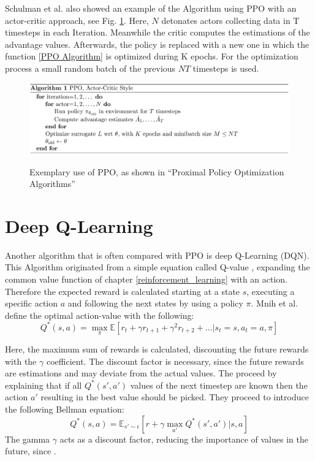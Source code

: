 Schulman et al. also showed an example of the Algorithm using PPO with an actor-critic approach, see Fig. \ref{fig:ppo_algo_code}. Here, $N$ detonates actors collecting data in T timesteps in each Iteration. Meanwhile the critic computes the estimations of the advantage values. Afterwards, the policy is replaced with a new one in which the function \eqref{PPO Algorithm} is optimized during K epochs. For the optimization process a small random batch of the previous $NT$ timesteps is used.
\begin{figure}[hpbt]
    \centering
    \includegraphics[width=1\textwidth]{pictures/ppo_algo_code.png}\\
    \caption[Exemplary Use Of PPO]{Exemplary use of PPO, as shown in ``Proximal Policy Optimization Algorithms''\cite{scwo17}}\label{fig:ppo_algo_code}
\end{figure}

\section{Deep Q-Learning}
Another algorithm that is often compared with PPO is deep Q-Learning (DQN). This Algorithm originated from a simple equation called Q-value \cite{jaja19}, expanding the common value function of chapter \ref{reinforcement_learning} with an action. Therefore the expected reward is calculated starting at a state $s$, executing a specific action $a$ and following the next states by using a policy $\pi$. Mnih et al. \cite{mnka13} define the optimal action-value with the following:
\begin{equation}\label{qvalue}
    Q^*(s,a) = \max_{\pi} \mathbb{E}\left[ r_{t} + \gamma r_{t+1} + \gamma^2 r_{t+2} + \ldots | s_t = s, a_t = a, \pi \right]
\end{equation}

Here, the maximum sum of rewards is calculated, discounting the future rewards with the $\gamma$ coefficient. The discount factor is necessary, since the future rewards are estimations and may deviate from the actual values. The proceed by explaining that if all $Q^*(s',a')$ values of the next timestep are known then the action $a'$ resulting in the best value should be picked. They proceed to introduce the following Bellman equation:
\begin{equation}\label{opt_qvalue}
    Q^*(s,a) = \mathbb{E}_{s'\sim \epsilon} \left[ r + \gamma \max_{a'} Q^*(s',a') | s,a \right]
\end{equation}
The gamma $\gamma$ acts as a discount factor, reducing the importance of values in the future, since .
% 